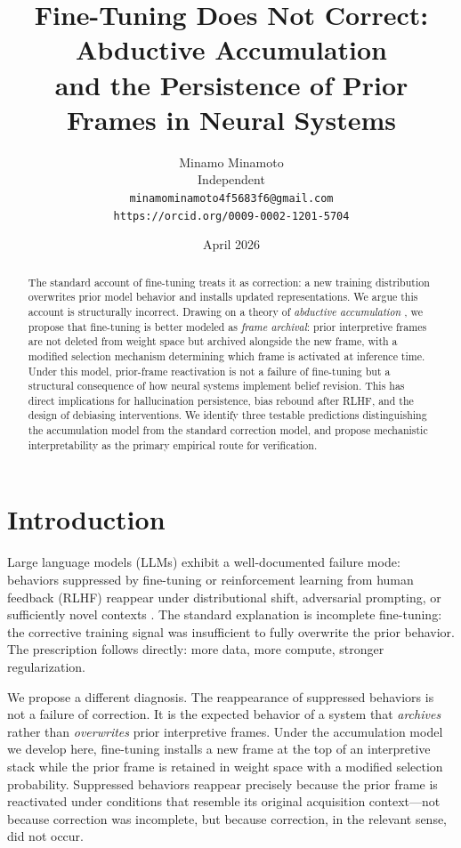 \documentclass[12pt]{article}
\title{Fine-Tuning Does Not Correct: Abductive Accumulation\\
and the Persistence of Prior Frames in Neural Systems}
\author{Minamo Minamoto\\
\small Independent\\
\small \texttt{minamominamoto4f5683f6@gmail.com}\\
\small \texttt{https://orcid.org/0009-0002-1201-5704}}
\date{April 2026}
\begin{document}
\maketitle

\begin{abstract}
The standard account of fine-tuning treats it as correction: a new
training distribution overwrites prior model behavior and installs
updated representations. We argue this account is structurally
incorrect. Drawing on a theory of \emph{abductive accumulation}
\cite{minamoto2026accum}, we propose that fine-tuning is better
modeled as \emph{frame archival}: prior interpretive frames are not
deleted from weight space but archived alongside the new frame, with
a modified selection mechanism determining which frame is activated
at inference time. Under this model, prior-frame reactivation is
not a failure of fine-tuning but a structural consequence of how
neural systems implement belief revision. This has direct implications
for hallucination persistence, bias rebound after RLHF, and the
design of debiasing interventions. We identify three testable
predictions distinguishing the accumulation model from the standard
correction model, and propose mechanistic interpretability as the
primary empirical route for verification.
\end{abstract}

\section{Introduction}

Large language models (LLMs) exhibit a well-documented failure mode:
behaviors suppressed by fine-tuning or reinforcement learning from
human feedback (RLHF) reappear under distributional shift, adversarial
prompting, or sufficiently novel contexts
\cite{perez2022ignore, wei2023jailbroken, yang2023shadow}.
The standard explanation is incomplete fine-tuning: the corrective
training signal was insufficient to fully overwrite the prior behavior.
The prescription follows directly: more data, more compute, stronger
regularization.

We propose a different diagnosis. The reappearance of suppressed
behaviors is not a failure of correction. It is the expected behavior
of a system that \emph{archives} rather than \emph{overwrites} prior
interpretive frames. Under the accumulation model we develop here,
fine-tuning installs a new frame at the top of an interpretive
stack while the prior frame is retained in weight space with a
modified selection probability. Suppressed behaviors reappear
precisely because the prior frame is reactivated under conditions
that resemble its original acquisition context---not because
correction was incomplete, but because correction, in the relevant
sense, did not occur.
\end{document}
